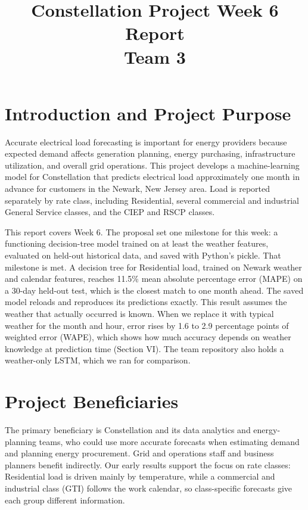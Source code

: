 \documentclass[conference]{IEEEtran}
\begin{document}
\title{Constellation Project Week 6 Report\\Team 3}
\author{}
\maketitle

\section{Introduction and Project Purpose}
Accurate electrical load forecasting is important for energy providers because expected demand affects generation planning, energy purchasing, infrastructure utilization, and overall grid operations. This project develops a machine-learning model for Constellation that predicts electrical load approximately one month in advance for customers in the Newark, New Jersey area. Load is reported separately by rate class, including Residential, several commercial and industrial General Service classes, and the CIEP and RSCP classes.

This report covers Week 6. The proposal set one milestone for this week: a functioning decision-tree model trained on at least the weather features, evaluated on held-out historical data, and saved with Python's pickle. That milestone is met. A decision tree for Residential load, trained on Newark weather and calendar features, reaches 11.5\% mean absolute percentage error (MAPE) on a 30-day held-out test, which is the closest match to one month ahead. The saved model reloads and reproduces its predictions exactly. This result assumes the weather that actually occurred is known. When we replace it with typical weather for the month and hour, error rises by 1.6 to 2.9 percentage points of weighted error (WAPE), which shows how much accuracy depends on weather knowledge at prediction time (Section VI). The team repository also holds a weather-only LSTM, which we ran for comparison.

\section{Project Beneficiaries}
The primary beneficiary is Constellation and its data analytics and energy-planning teams, who could use more accurate forecasts when estimating demand and planning energy procurement. Grid and operations staff and business planners benefit indirectly. Our early results support the focus on rate classes: Residential load is driven mainly by temperature, while a commercial and industrial class (GTI) follows the work calendar, so class-specific forecasts give each group different information.
\end{document}
